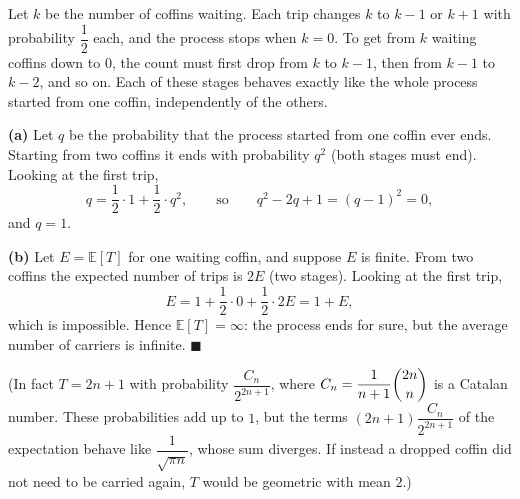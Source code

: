 Let $k$ be the number of coffins waiting. Each trip changes $k$ to $k-1$ or $k+1$ with probability $\dfrac12$ each, and the process stops when $k=0$. To get from $k$ waiting coffins down to $0$, the count must first drop from $k$ to $k-1$, then from $k-1$ to $k-2$, and so on. Each of these stages behaves exactly like the whole process started from one coffin, independently of the others.

\textbf{(a)} Let $q$ be the probability that the process started from one coffin ever ends. Starting from two coffins it ends with probability $q^2$ (both stages must end). Looking at the first trip,
\[q=\dfrac12\cdot1+\dfrac12\cdot q^2,\qquad\text{so}\qquad q^2-2q+1=(q-1)^2=0,\]
and $q=1$.

\textbf{(b)} Let $E=\mathbb E[T]$ for one waiting coffin, and suppose $E$ is finite. From two coffins the expected number of trips is $2E$ (two stages). Looking at the first trip,
\[E=1+\dfrac12\cdot0+\dfrac12\cdot2E=1+E,\]
which is impossible. Hence $\boxed{\mathbb E[T]=\infty}$: the process ends for sure, but the average number of carriers is infinite. $\blacksquare$

(In fact $T=2n+1$ with probability $\dfrac{C_n}{2^{2n+1}}$, where $C_n=\dfrac1{n+1}\dbinom{2n}n$ is a Catalan number. These probabilities add up to $1$, but the terms $(2n+1)\dfrac{C_n}{2^{2n+1}}$ of the expectation behave like $\dfrac{1}{\sqrt{\pi n}}$, whose sum diverges. If instead a dropped coffin did not need to be carried again, $T$ would be geometric with mean $2$.)
